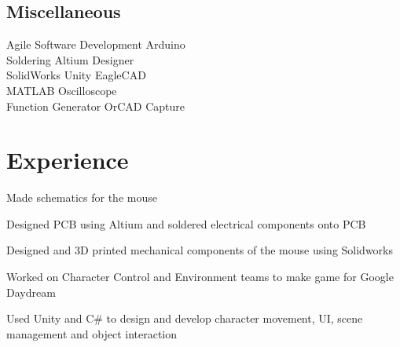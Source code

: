 \documentclass[]{deedy-resume-openfont}
\begin{document}
\begin{minipage}[t]{0.31\textwidth}
\subsection{Miscellaneous}
Agile Software Development \textbullet{} Arduino \\
Soldering \textbullet{} Altium Designer \\
SolidWorks \textbullet{} Unity \textbullet{} EagleCAD \\
MATLAB \textbullet{} Oscilloscope \\
Function Generator \textbullet{} OrCAD Capture

%
%

\end{minipage} 
\hfill
\begin{minipage}[t]{0.66\textwidth} 


\section{Experience}

\sectionsep
\begin{tightemize}
\item Made schematics for the mouse
\item Designed PCB using Altium and soldered electrical components onto PCB
\item Designed and 3D printed mechanical components of the mouse using Solidworks
\end{tightemize}
\sectionsep

\begin{tightemize} 
\item Worked on Character Control and Environment teams to make game for Google Daydream
\item Used Unity and C\# to design and develop character movement, UI, scene management and object interaction
\end{tightemize}
\sectionsep


\end{minipage}
\end{document}

